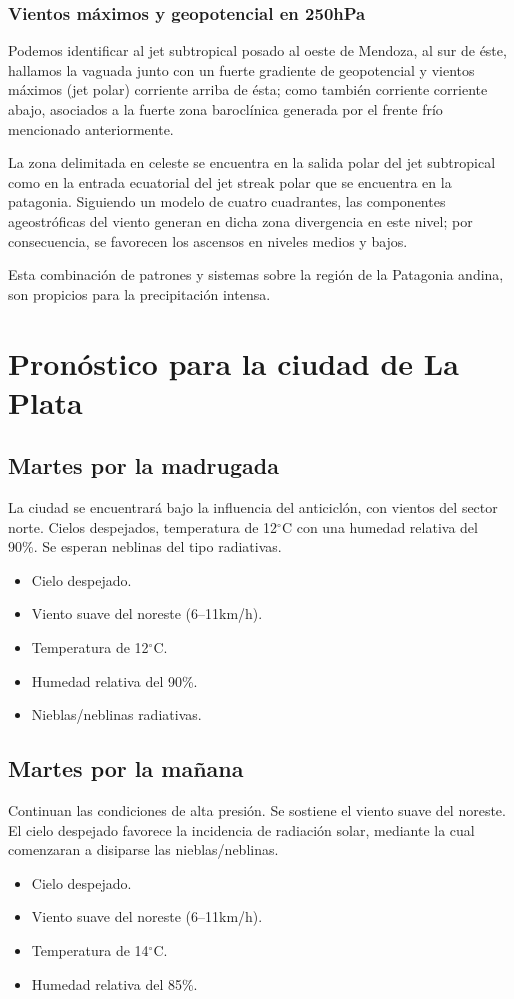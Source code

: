 \documentclass{article}
\begin{document}
\subsubsection{Vientos máximos y geopotencial en 250hPa}
Podemos identificar al jet subtropical posado al oeste de Mendoza, al sur de éste, hallamos la vaguada junto con un fuerte 
gradiente de geopotencial y vientos máximos (jet polar) corriente arriba de ésta; como también corriente corriente abajo, asociados
a la fuerte zona baroclínica generada por el frente frío mencionado anteriormente.
\par La zona delimitada en celeste se encuentra en la salida polar del jet subtropical como en la entrada ecuatorial del jet streak
polar que se encuentra en la patagonia. Siguiendo un modelo de cuatro cuadrantes, las componentes ageostróficas del viento generan 
en dicha zona divergencia en este nivel; por consecuencia, se favorecen los ascensos en niveles medios y bajos.
\par Esta combinación de patrones y sistemas sobre la región de la Patagonia andina, son propicios para la precipitación intensa.

\section{Pronóstico para la ciudad de La Plata}
\subsection{Martes por la madrugada}
La ciudad se encuentrará bajo la influencia del anticiclón, con vientos del sector norte.
Cielos despejados, temperatura de 12$^\circ$C con una humedad relativa del 90\%. Se esperan neblinas del tipo radiativas.
\begin{itemize}
    \item Cielo despejado.
    \item Viento suave del noreste (6--11km/h).
    \item Temperatura de 12$^\circ$C.
    \item Humedad relativa del 90\%.
    \item Nieblas/neblinas radiativas.
\end{itemize}

\subsection{Martes por la mañana}
Continuan las condiciones de alta presión. Se sostiene el viento suave del noreste. El cielo despejado favorece la incidencia de radiación solar,
mediante la cual comenzaran a disiparse las nieblas/neblinas.
\begin{itemize}
    \item Cielo despejado.
    \item Viento suave del noreste (6--11km/h).
    \item Temperatura de 14$^\circ$C.
    \item Humedad relativa del 85\%.
\end{itemize}
\end{document}
